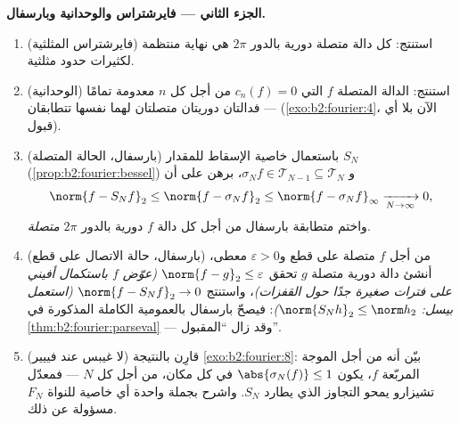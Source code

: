\begin{problem}
\medskip
\noindent\textbf{الجزء الثاني --- فايرشتراس والوحدانية
وبارسفال.}
\begin{enumerate}[resume]
  \item (فايرشتراس المثلثية) استنتج: كل دالة متصلة
        دورية بالدور $2\pi$ هي نهاية منتظمة
        لكثيرات حدود مثلثية.
  \item (الوحدانية) استنتج: الدالة المتصلة $f$ التي $c_n(f) = 0$
        من أجل كل $n$ معدومة تمامًا --- فدالتان دوريتان
        متصلتان لهما  نفسها
        تتطابقان (\cref{exo:b2:fourier:4}، الآن بلا أي
        قبول).
  \item (بارسفال، الحالة المتصلة) باستعمال خاصية الإسقاط
        للمقدار $S_N$ (\cref{prop:b2:fourier:bessel}) و
        $\sigma_Nf \in \mathcal T_{N-1} \subseteq \mathcal
        T_N$، برهن على أن
        \[
        \norm{f - S_Nf}_2 \leq \norm{f - \sigma_Nf}_2
        \leq \norm{f - \sigma_Nf}_\infty
        \xrightarrow[N\to\infty]{} 0 ,
        \]
        واختم متطابقة بارسفال من أجل كل دالة $f$ دورية بالدور $2\pi$
        \emph{متصلة}.
  \item (بارسفال، حالة الاتصال على قطع) من أجل $f$
        متصلة على قطع و$\varepsilon > 0$ معطى، أنشئ
        دالة دورية متصلة $g$ تحقق $\norm{f - g}_2 \leq
        \varepsilon$ \emph{(عوّض $f$ باستكمال
        أفيني على فترات صغيرة جدًا حول القفزات)}،
        واستنتج $\norm{f - S_Nf}_2 \to 0$
        \emph{(استعمل بيسل: $\norm{S_Nh}_2 \leq \norm h_2$)}:
        فيصحّ بارسفال بالعمومية الكاملة المذكورة في
        \cref{thm:b2:fourier:parseval} --- وقد زال ``المقبول''.
  \item (لا غيبس عند فييير) قارِن بالنتيجة \cref{exo:b2:fourier:8}: بيّن أنه من أجل الموجة المربّعة
        $f$، يكون $\abs{\sigma_N(f)} \leq 1$ في كل مكان، من أجل كل
        $N$ --- فمعدّل تشيزارو يمحو التجاوز الذي
        يطارد $S_N$. واشرح بجملة واحدة أي خاصية
        للنواة $F_N$ مسؤولة عن ذلك.
\end{enumerate}


\end{problem}
